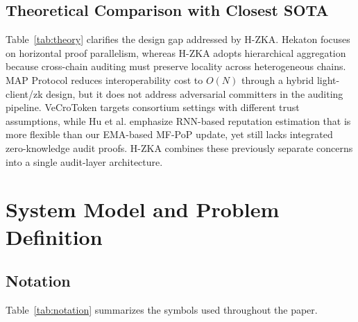 \documentclass[journal]{IEEEtran}
\begin{document}
\subsection{Theoretical Comparison with Closest SOTA}



Table~\ref{tab:theory} clarifies the design gap addressed by H-ZKA. Hekaton focuses on horizontal proof parallelism, whereas H-ZKA adopts hierarchical aggregation because cross-chain auditing must preserve locality across heterogeneous chains. MAP Protocol reduces interoperability cost to $O(N)$ through a hybrid light-client/zk design, but it does not address adversarial committers in the auditing pipeline. VeCroToken targets consortium settings with different trust assumptions, while Hu et al. emphasize RNN-based reputation estimation that is more flexible than our EMA-based MF-PoP update, yet still lacks integrated zero-knowledge audit proofs. H-ZKA combines these previously separate concerns into a single audit-layer architecture.


\section{System Model and Problem Definition}

\subsection{Notation}

Table~\ref{tab:notation} summarizes the symbols used throughout the paper.
\end{document}
